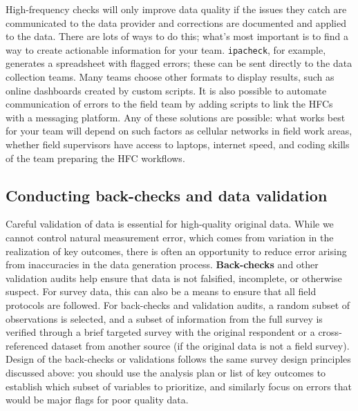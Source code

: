 High-frequency checks will only improve data quality
if the issues they catch are communicated to the data provider
and corrections are documented and applied to the data.
There are lots of ways to do this;
what's most important is to find a way to create actionable information for your team.
\texttt{ipacheck}, for example, generates a spreadsheet with flagged errors;
these can be sent directly to the data collection teams.
Many teams choose other formats to display results,
such as online dashboards created by custom scripts.
It is also possible to automate communication of errors to the field team
by adding scripts to link the HFCs with a messaging platform.
Any of these solutions are possible:
what works best for your team will depend on such factors as
cellular networks in field work areas, whether field supervisors have access to laptops,
internet speed, and coding skills of the team preparing the HFC workflows.

\subsection{Conducting back-checks and data validation}

Careful validation of data is essential for high-quality original data.
While we cannot control natural measurement error,
which comes from variation in the realization of key outcomes,
there is often an opportunity to reduce error arising from inaccuracies in the data generation process.
\textbf{Back-checks} and
other validation audits help ensure that data is not falsified, incomplete, or otherwise suspect.
For survey data, this can also be a means to ensure that all field protocols are followed.
For back-checks and validation audits, a random subset of observations is selected,
and a subset of information from the full survey is
verified through a brief targeted survey with the original respondent
or a cross-referenced dataset from another source (if the original data is not a field survey).
Design of the back-checks or validations follows the same survey design
principles discussed above: you should use the analysis plan
or list of key outcomes to establish which subset of variables to prioritize,
and similarly focus on errors that would be major flags for poor quality data.

